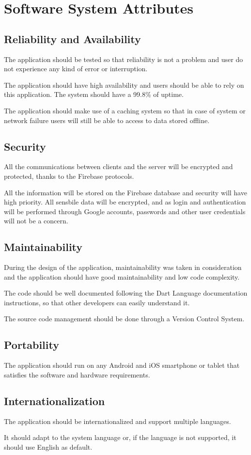 \section{Software System Attributes}

\subsection{Reliability and Availability}
The application should  be tested so that reliability is not a problem and user do not experience any kind of error or interruption.

The application should have high availability and users should be able to rely on this application.
The system should have a 99.8\% of uptime.

The application should make use of a caching system so that in case of system or network failure users will still be able to access to data stored offline.

\subsection{Security}
All the communications between clients and the server will be encrypted and protected, thanks to the Firebase protocols.

All the information will be stored on the Firebase database and security will have high priority. All sensbile data will be encrypted,
and as login and authentication will be performed through Google accounts, passwords and other user credentials will not be a concern.

\subsection{Maintainability}
During the design of the application, maintainability was taken in consideration and the application should have good maintainability and low code complexity.

The code should be well documented following the Dart Language documentation instructions, so that other developers can easily understand it.

The source code management should be done through a Version Control System.


\subsection{Portability}
The application should run on any Android and iOS smartphone or 
tablet that satisfies the software and hardware requirements.

\subsection{Internationalization}
The application should be internationalized and support multiple languages.

It should adapt to the system language or, if the language is not supported, it should use English as default.